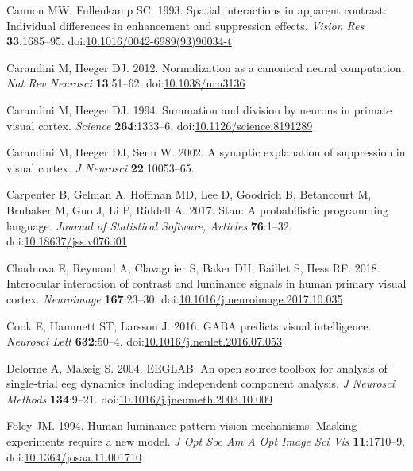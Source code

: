 \documentclass[]{article}
\begin{document}
\leavevmode\hypertarget{ref-Cannon1993}{}%
Cannon MW, Fullenkamp SC. 1993. Spatial interactions in apparent contrast: Individual differences in enhancement and suppression effects. \emph{Vision Res} \textbf{33}:1685--95. doi:\href{https://doi.org/10.1016/0042-6989(93)90034-t}{10.1016/0042-6989(93)90034-t}

\leavevmode\hypertarget{ref-Carandini2012}{}%
Carandini M, Heeger DJ. 2012. Normalization as a canonical neural computation. \emph{Nat Rev Neurosci} \textbf{13}:51--62. doi:\href{https://doi.org/10.1038/nrn3136}{10.1038/nrn3136}

\leavevmode\hypertarget{ref-Carandini1994}{}%
Carandini M, Heeger DJ. 1994. Summation and division by neurons in primate visual cortex. \emph{Science} \textbf{264}:1333--6. doi:\href{https://doi.org/10.1126/science.8191289}{10.1126/science.8191289}

\leavevmode\hypertarget{ref-Carandini2002}{}%
Carandini M, Heeger DJ, Senn W. 2002. A synaptic explanation of suppression in visual cortex. \emph{J Neurosci} \textbf{22}:10053--65.

\leavevmode\hypertarget{ref-Carpenter2017}{}%
Carpenter B, Gelman A, Hoffman MD, Lee D, Goodrich B, Betancourt M, Brubaker M, Guo J, Li P, Riddell A. 2017. Stan: A probabilistic programming language. \emph{Journal of Statistical Software, Articles} \textbf{76}:1--32. doi:\href{https://doi.org/10.18637/jss.v076.i01}{10.18637/jss.v076.i01}

\leavevmode\hypertarget{ref-Chadnova2018}{}%
Chadnova E, Reynaud A, Clavagnier S, Baker DH, Baillet S, Hess RF. 2018. Interocular interaction of contrast and luminance signals in human primary visual cortex. \emph{Neuroimage} \textbf{167}:23--30. doi:\href{https://doi.org/10.1016/j.neuroimage.2017.10.035}{10.1016/j.neuroimage.2017.10.035}

\leavevmode\hypertarget{ref-Cook2016}{}%
Cook E, Hammett ST, Larsson J. 2016. GABA predicts visual intelligence. \emph{Neurosci Lett} \textbf{632}:50--4. doi:\href{https://doi.org/10.1016/j.neulet.2016.07.053}{10.1016/j.neulet.2016.07.053}

\leavevmode\hypertarget{ref-Delorme2004}{}%
Delorme A, Makeig S. 2004. EEGLAB: An open source toolbox for analysis of single-trial eeg dynamics including independent component analysis. \emph{J Neurosci Methods} \textbf{134}:9--21. doi:\href{https://doi.org/10.1016/j.jneumeth.2003.10.009}{10.1016/j.jneumeth.2003.10.009}

\leavevmode\hypertarget{ref-Foley1994}{}%
Foley JM. 1994. Human luminance pattern-vision mechanisms: Masking experiments require a new model. \emph{J Opt Soc Am A Opt Image Sci Vis} \textbf{11}:1710--9. doi:\href{https://doi.org/10.1364/josaa.11.001710}{10.1364/josaa.11.001710}
\end{document}
